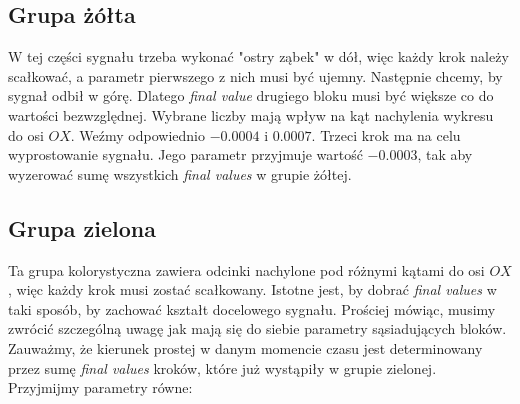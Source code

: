 \documentclass[12pt]{mwart}
\begin{document}
	\subsection{Grupa żółta}
	\noindent W tej części sygnału trzeba wykonać "ostry ząbek" w dół, więc każdy krok należy scałkować, a parametr pierwszego z nich musi być ujemny. Następnie chcemy, by sygnał odbił w górę. Dlatego \textit{final value} drugiego bloku musi być większe co do wartości bezwzględnej.	Wybrane liczby mają wpływ na kąt nachylenia wykresu do osi $OX$. Weźmy odpowiednio $-0.0004$ i $0.0007$. Trzeci krok ma na celu wyprostowanie sygnału. Jego parametr przyjmuje wartość $-0.0003$, tak aby wyzerować sumę wszystkich \textit{final values} w grupie żółtej.
	
	
	\subsection{Grupa zielona}
	\noindent Ta grupa kolorystyczna zawiera odcinki nachylone pod różnymi kątami do osi $OX$, więc każdy krok musi zostać scałkowany. Istotne jest, by dobrać \textit{final values} w taki sposób, by zachować kształt docelowego sygnału. Prościej mówiąc, musimy zwrócić szczególną uwagę jak mają się do siebie parametry sąsiadujących bloków. Zauważmy, że kierunek prostej w danym momencie czasu jest determinowany przez sumę \textit{final values} kroków, które już wystąpiły w grupie zielonej. Przyjmijmy parametry równe: 
	
	\begin{table}[H]
    \centering
	\end{table}
\end{document}
